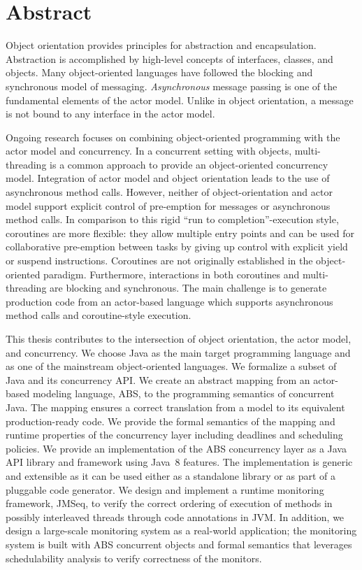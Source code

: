 %
\chapter*{Abstract}
\label{sec:abstract}
\vspace*{-10mm}

Object orientation provides principles for abstraction and encapsulation.
Abstraction is accomplished by high-level concepts of interfaces, classes, and objects.
Many object-oriented languages have followed the blocking and synchronous model of messaging. 
\emph{Asynchronous} message passing is one of the fundamental elements of the actor model.
Unlike in object orientation, a message is not bound to any interface in the actor model.

Ongoing research focuses on combining object-oriented programming with the actor model and concurrency.
In a concurrent setting with objects, multi-threading is a common approach to provide an object-oriented concurrency model.
Integration of actor model and object orientation leads to the use of asynchronous method calls.
However, neither of object-orientation and actor model support explicit control of pre-emption for messages or asynchronous method calls.
In comparison to this rigid ``run to completion''-execution style, coroutines are more flexible: they allow multiple entry points and can be used for collaborative pre-emption between tasks by giving up control with explicit yield or suspend instructions.
Coroutines are not originally established in the object-oriented paradigm.
Furthermore, interactions in both coroutines and multi-threading are blocking and synchronous.
The main challenge is to generate production code from an actor-based language which supports asynchronous method calls and coroutine-style execution.

This thesis contributes to the intersection of object orientation, the actor model, and concurrency.
We choose Java as the main target programming language and as one of the mainstream 
object-oriented languages. 
We formalize a subset of Java and its concurrency API.
We create an abstract mapping from an actor-based modeling language, ABS, to the programming semantics of concurrent Java. 
The mapping ensures a correct translation from a model to its equivalent production-ready code.
We provide the formal semantics of the mapping and runtime properties of 
the concurrency layer including deadlines and scheduling policies.
We provide an implementation of the ABS concurrency layer as a Java API library and framework using Java~8 features.
The implementation is generic and extensible as it can be used either as a standalone library or as part of a pluggable code generator.
We design and implement a runtime monitoring framework, JMSeq, to verify the
correct ordering of execution of methods in possibly interleaved threads through code annotations in JVM. 
In addition, we design a large-scale monitoring system as a real-world 
application; the monitoring system is built with ABS concurrent objects 
and formal semantics that leverages schedulability analysis to verify correctness of the monitors.


